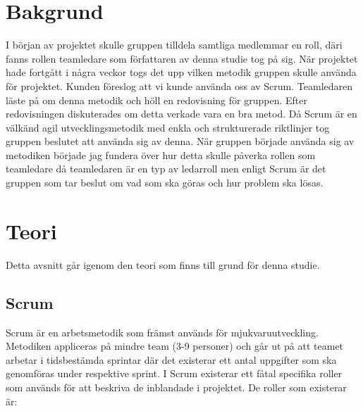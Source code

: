\section{Bakgrund}
I början av projektet skulle gruppen tilldela samtliga medlemmar en roll, däri fanns rollen teamledare som författaren av denna studie tog på sig. När projektet hade fortgått i några veckor togs det upp vilken metodik gruppen skulle använda för projektet. Kunden föreslog att vi kunde använda oss av Scrum. Teamledaren läste på om denna metodik och höll en redovisning för gruppen. Efter redovisningen diskuterades om detta verkade vara en bra metod. Då Scrum är en välkänd agil utvecklingsmetodik med enkla och strukturerade riktlinjer tog gruppen beslutet att använda sig av denna. När gruppen började använda sig av metodiken började jag fundera över hur detta skulle påverka rollen som teamledare då teamledaren är en typ av ledarroll men enligt Scrum är det gruppen som tar beslut om vad som ska göras och hur problem ska lösas.

\section{Teori}
Detta avsnitt går igenom den teori som finns till grund för denna studie.

\subsection{Scrum} \label{adam_scrum}
Scrum är en arbetsmetodik som främst används för mjukvaruutveckling. Metodiken appliceras på mindre team (3-9 personer) och går ut på att teamet arbetar i tidsbestämda sprintar där det existerar ett antal uppgifter som ska genomföras under respektive sprint.
I Scrum existerar ett fåtal specifika roller som används för att beskriva de inblandade i projektet. De roller som existerar är:

